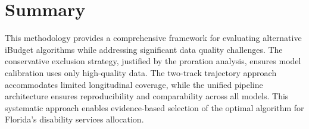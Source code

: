\section{Summary}

This methodology provides a comprehensive framework for evaluating alternative iBudget algorithms while addressing significant data quality challenges. The conservative exclusion strategy, justified by the proration analysis, ensures model calibration uses only high-quality data. The two-track trajectory approach accommodates limited longitudinal coverage, while the unified pipeline architecture ensures reproducibility and comparability across all models. This systematic approach enables evidence-based selection of the optimal algorithm for Florida's disability services allocation.